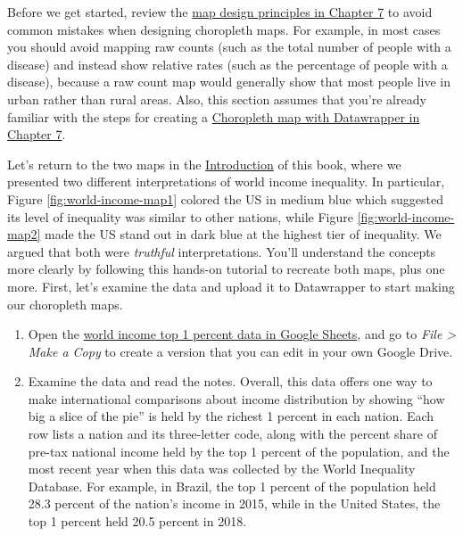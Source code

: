 \documentclass[
  english,
]{book}
\begin{document}
Before we get started, review the \href{map-design.html}{map design principles in Chapter 7} to avoid common mistakes when designing choropleth maps. For example, in most cases you should avoid mapping raw counts (such as the total number of people with a disease) and instead show relative rates (such as the percentage of people with a disease), because a raw count map would generally show that most people live in urban rather than rural areas. Also, this section assumes that you're already familiar with the steps for creating a \href{choropleth-datawrapper.html}{Choropleth map with Datawrapper in Chapter 7}.

Let's return to the two maps in the \href{introduction.html}{Introduction} of this book, where we presented two different interpretations of world income inequality. In particular, Figure \ref{fig:world-income-map1} colored the US in medium blue which suggested its level of inequality was similar to other nations, while Figure \ref{fig:world-income-map2} made the US stand out in dark blue at the highest tier of inequality. We argued that both were \emph{truthful} interpretations. You'll understand the concepts more clearly by following this hands-on tutorial to recreate both maps, plus one more. First, let's examine the data and upload it to Datawrapper to start making our choropleth maps.

\begin{enumerate}
\def\labelenumi{\arabic{enumi}.}
\item
  Open the \href{https://docs.google.com/spreadsheets/d/1IomO4pyGziTZnQrlSnlO11zqgdohwwTm2olR2-tGPfI/edit\#gid=1463939565}{world income top 1 percent data in Google Sheets}, and go to \emph{File \textgreater{} Make a Copy} to create a version that you can edit in your own Google Drive.
\item
  Examine the data and read the notes. Overall, this data offers one way to make international comparisons about income distribution by showing ``how big a slice of the pie'' is held by the richest 1 percent in each nation. Each row lists a nation and its three-letter code, along with the percent share of pre-tax national income held by the top 1 percent of the population, and the most recent year when this data was collected by the World Inequality Database. For example, in Brazil, the top 1 percent of the population held 28.3 percent of the nation's income in 2015, while in the United States, the top 1 percent held 20.5 percent in 2018.
\end{enumerate}
\end{document}
